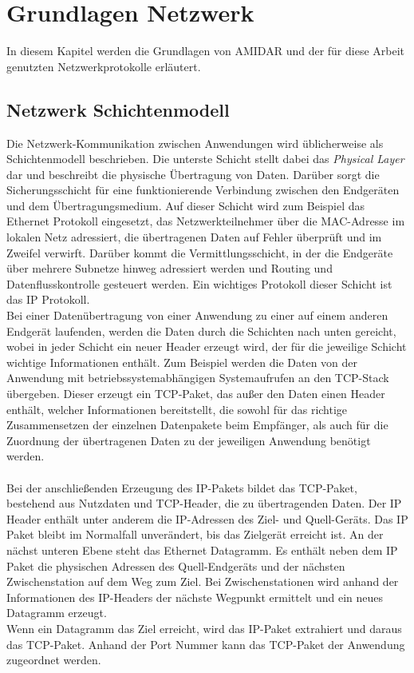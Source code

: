 \chapter{Grundlagen Netzwerk}
In diesem Kapitel werden die Grundlagen von AMIDAR und der für diese Arbeit genutzten Netzwerkprotokolle erläutert. 

\section{Netzwerk Schichtenmodell}
Die Netzwerk-Kommunikation zwischen Anwendungen wird üblicherweise als Schichtenmodell beschrieben.  
Die unterste Schicht stellt dabei das \textit{Physical Layer} dar und beschreibt die physische Übertragung von Daten. 
Darüber sorgt die Sicherungsschicht für eine funktionierende Verbindung zwischen den Endgeräten und dem Übertragungsmedium. Auf dieser Schicht wird zum Beispiel das Ethernet Protokoll eingesetzt, das Netzwerkteilnehmer über die MAC-Adresse im lokalen Netz adressiert, die übertragenen Daten auf Fehler überprüft und im Zweifel verwirft. 
Darüber kommt die Vermittlungsschicht, in der die Endgeräte über mehrere Subnetze hinweg adressiert werden und Routing und Datenflusskontrolle gesteuert werden. Ein wichtiges Protokoll dieser Schicht ist das IP Protokoll. \\
Bei einer Datenübertragung von einer Anwendung zu einer auf einem anderen Endgerät laufenden, werden die Daten durch die Schichten nach unten gereicht, wobei in jeder Schicht ein neuer Header erzeugt wird, der für die jeweilige Schicht wichtige Informationen enthält. Zum Beispiel werden die Daten von der Anwendung mit betriebssystemabhängigen Systemaufrufen an den TCP-Stack übergeben. Dieser erzeugt ein TCP-Paket, das außer den Daten einen Header enthält, welcher Informationen bereitstellt, die sowohl für das richtige Zusammensetzen der einzelnen Datenpakete beim Empfänger, als auch für die Zuordnung der übertragenen Daten zu der jeweiligen Anwendung benötigt werden.\\\\
Bei der anschließenden Erzeugung des IP-Pakets bildet das TCP-Paket, bestehend aus Nutzdaten und TCP-Header, die zu übertragenden Daten. Der IP Header enthält unter anderem die IP-Adressen des Ziel- und Quell-Geräts. Das IP Paket bleibt im Normalfall unverändert, bis das Zielgerät erreicht ist. An der nächst unteren Ebene steht das Ethernet Datagramm. Es enthält neben dem IP Paket die physischen Adressen des Quell-Endgeräts und der nächsten Zwischenstation auf dem Weg zum Ziel. Bei Zwischenstationen wird anhand der Informationen des IP-Headers der nächste Wegpunkt ermittelt und ein neues Datagramm erzeugt. \\
Wenn ein Datagramm das Ziel erreicht, wird das IP-Paket extrahiert und daraus das TCP-Paket. Anhand der Port Nummer kann das TCP-Paket der Anwendung zugeordnet werden.\cite{Layer}



